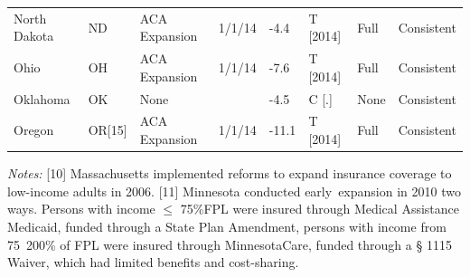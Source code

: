 \documentclass[12pt]{article}%
\begin{document}
\begin{appendices}
\begin{table}[]
\begin{adjustbox}{width=.99\textwidth}
\begin{tabular}{@{}llllllll@{}}
North Dakota                                 & ND                          & ACA Expansion                                                                                               & 1/1/14                   & -4.4                                                                                     & T {[}2014{]}                  & Full                         & Consistent                                                                                 \\ \addlinespace
Ohio                                         & OH                          & ACA Expansion                                                                                               & 1/1/14                   & -7.6                                                                                     & T {[}2014{]}                  & Full                         & Consistent                                                                                 \\ \addlinespace
Oklahoma                                     & OK                          & None                                                                                                        &                          & -4.5                                                                                       & C {[}.{]}                     & None                         & Consistent                                                                                 \\ \addlinespace
Oregon                                       & OR{[}15{]}                  & ACA Expansion                                                                                               & 1/1/14                   & -11.1                                                                                     & T {[}2014{]}                  & Full                         & Consistent                                                                                 \\ \bottomrule
\end{tabular}
\end{adjustbox}
\begin{scriptsize}
 \begin{justify}
   \textit{Notes:} [10] Massachusetts implemented reforms to expand insurance coverage to low-income adults in 2006.
[11] Minnesota conducted early expansion in 2010 two ways. Persons with income  $\leq$ 75\%FPL were insured through Medical Assistance Medicaid, funded through a State Plan Amendment, persons with income from 75~200\% of FPL were insured through MinnesotaCare, funded through a § 1115 Waiver, which had limited benefits and cost-sharing.

\end{justify}
\end{scriptsize}
\end{table}
\end{appendices}
\end{document}
